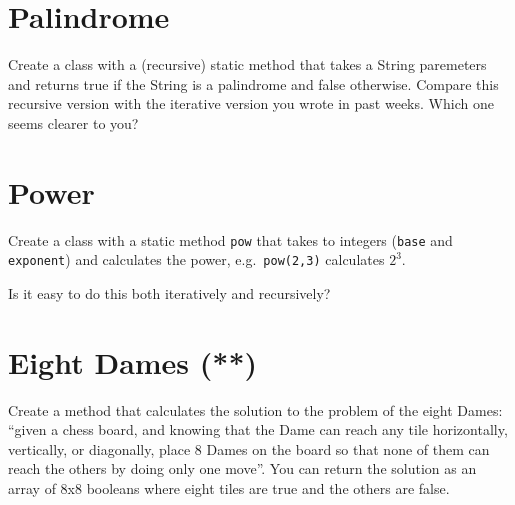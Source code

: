\documentclass{article}
\begin{document}
\section{Palindrome}
\label{sec:palindrome}

Create a class with a (recursive) static method that takes a String
paremeters and
returns true if the String is a palindrome and false
otherwise. Compare this recursive version with the iterative version
you wrote in past weeks. Which one seems clearer to you?

\section{Power}
\label{sec:power}

Create a class with a static method \verb+pow+ that takes to integers
(\verb+base+ and \verb+exponent+) and calculates the power, 
e.g.~\verb+pow(2,3)+ calculates $2^3$. 

Is it easy to do this both iteratively and recursively? 






\section{Eight Dames (**)}
\label{sec:eight-dames}

Create a method that calculates the solution to the problem of the
eight Dames: ``given a chess board, and knowing that the Dame can reach
any tile horizontally, vertically, or diagonally, place 8 Dames on the
board so that none of them can reach the others by doing only one
move''. You can return the solution as an array of 8x8 booleans where
eight tiles are true and the others are false. 
\end{document}

